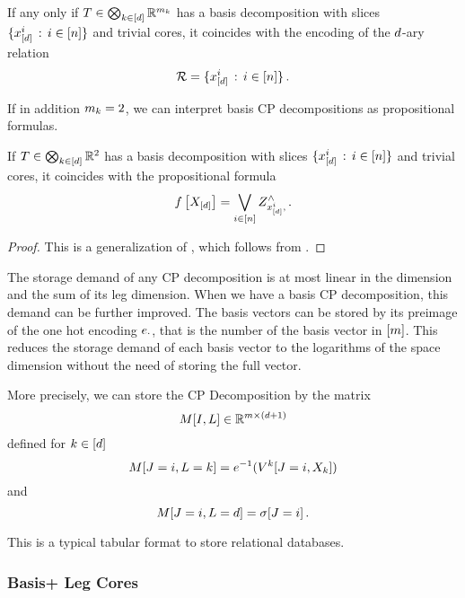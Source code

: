 \begin{theorem}
	If any only if $T\in\bigotimes_{k\in[d]} \mathbb{R}^{m_{k}}$ has a basis decomposition with slices $\{x_{[d]}^{i} \, : \, i\in[n] \}$ and trivial cores, it coincides with the encoding of the $d$-ary relation 
		\[ \mathcal{R} = \{x_{[d]}^{i} \, : \, i\in[n] \} \, . \]
\end{theorem}


If in addition $m_{k}=2$, we can interpret basis CP decompositions as propositional formulas.

\begin{theorem}
	If $T\in\bigotimes_{k\in[d]}\mathbb{R}^2$ has a basis decomposition with slices $\{x_{[d]}^{i} \, : \, i\in[n] \}$ and trivial cores, it coincides with the propositional formula
		\[ f\left[X_{[d]}\right] = 
		\bigvee_{i\in[n]} Z^{\land}_{x_{[d]}^{i},\,} . \]
\end{theorem}
\begin{proof}
	This is a generalization of , which follows from .
\end{proof}


The storage demand of any CP decomposition is at most linear in the dimension and the sum of its leg dimension.
When we have a basis CP decomposition, this demand can be further improved.
The basis vectors can be stored by its preimage of the one hot encoding $e_{\cdot}$, that is the number of the basis vector in $[m]$.
This reduces the storage demand of each basis vector to the logarithms of the space dimension without the need of storing the full vector.

More precisely, we can store the CP Decomposition by the matrix
	\[ M[I,L] \in \mathbb{R}^{m \times (d+1)} \]
defined for $k\in[d]$
	\[ M[J=i,L=k] 
	= e^{-1}(V^{k}[J=i,X_{k}])\]
and
	\[ M[J=i,L=d]  
	= \sigma[J=i] \, . \]
	
This is a typical tabular format to store relational databases.

\subsubsection{Basis+ Leg Cores}

